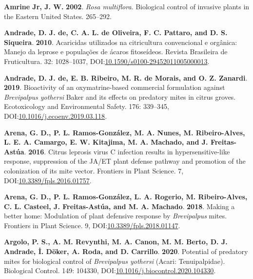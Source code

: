 \documentclass[12pt,final,CPage]{ufthesis}
\newlength{\cslhangindent}
\newenvironment{CSLReferences}[2] %
{%
	\setlength{\parindent}{0pt}
	\ifodd #1 \everypar{\setlength{\hangindent}{\cslhangindent}}\ignorespaces\fi
	\ifnum #2 > 0
	\setlength{\parskip}{#2\baselineskip}
	\fi
}%
{}
\begin{document}
{\begin{CSLReferences}{1}{0}
  \leavevmode{}%
  \textbf{Amrine Jr, J. W.} \textbf{2002}. {\emph{Rosa multiflora}}. Biological control of invasive plants in the Eastern {United States}. 265--292.

  \leavevmode{}%
  \textbf{Andrade, D. J. de, C. A. L. de Oliveira, F. C. Pattaro, and D. S. Siqueira}. \textbf{2010}. Acaricidas utilizados na citricultura convencional e org{â}nica: Manejo da leprose e popula{ç}{õ}es de {á}caros fitose{í}deos. Revista Brasileira de Fruticultura. 32: 1028--1037, DOI:\href{https://doi.org/10.1590/s0100-29452011005000013}{10.1590/s0100-29452011005000013}.

  \leavevmode{}%
  \textbf{Andrade, D. J. de, E. B. Ribeiro, M. R. de Morais, and O. Z. Zanardi}. \textbf{2019}. Bioactivity of an oxymatrine-based commercial formulation against {\emph{Brevipalpus yothersi}} {Baker} and its effects on predatory mites in citrus groves. Ecotoxicology and Environmental Safety. 176: 339--345, DOI:\href{https://doi.org/10.1016/j.ecoenv.2019.03.118}{10.1016/j.ecoenv.2019.03.118}.

  \leavevmode{}%
  \textbf{Arena, G. D., P. L. Ramos-González, M. A. Nunes, M. Ribeiro-Alves, L. E. A. Camargo, E. W. Kitajima, M. A. Machado, and J. Freitas-Astúa}. \textbf{2016}. {Citrus leprosis virus} {C} infection results in hypersensitive-like response, suppression of the {JA}/{ET} plant defense pathway and promotion of the colonization of its mite vector. Frontiers in Plant Science. 7, DOI:\href{https://doi.org/10.3389/fpls.2016.01757}{10.3389/fpls.2016.01757}.

  \leavevmode{}%
  \textbf{Arena, G. D., P. L. Ramos-González, L. A. Rogerio, M. Ribeiro-Alves, C. L. Casteel, J. Freitas-Astúa, and M. A. Machado}. \textbf{2018}. Making a better home: Modulation of plant defensive response by {\emph{Brevipalpus}} mites. Frontiers in Plant Science. 9, DOI:\href{https://doi.org/10.3389/fpls.2018.01147}{10.3389/fpls.2018.01147}.

  \leavevmode{}%
  \textbf{Argolo, P. S., A. M. Revynthi, M. A. Canon, M. M. Berto, D. J. Andrade, İ. Döker, A. Roda, and D. Carrillo}. \textbf{2020}. Potential of predatory mites for biological control of {\emph{Brevipalpus yothersi}} ({Acari}: {Tenuipalpidae}). Biological Control. 149: 104330, DOI:\href{https://doi.org/10.1016/j.biocontrol.2020.104330}{10.1016/j.biocontrol.2020.104330}.


\end{CSLReferences}}
\end{document}
